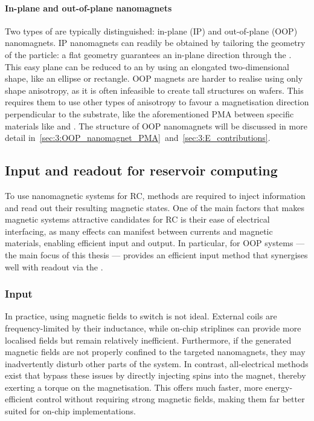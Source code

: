 \paragraph{In-plane and out-of-plane nanomagnets} %
Two types of  are typically distinguished: in-plane (IP) and out-of-plane (OOP) nanomagnets.
IP nanomagnets can readily be obtained by tailoring the geometry of the  particle: a flat geometry guarantees an in-plane  direction through the .
This easy plane can be reduced to an  by using an elongated two-dimensional shape, like an ellipse or rectangle.
OOP magnets are harder to realise using only shape anisotropy, as it is often infeasible to create tall structures on wafers.
This requires them to use other types of anisotropy to favour a magnetisation direction perpendicular to the substrate, like the aforementioned PMA between specific materials like  and .
The structure of OOP nanomagnets will be discussed in more detail in~\cref{sec:3:OOP_nanomagnet_PMA}~and~\ref{sec:3:E_contributions}.

\subsection{Input and readout for reservoir computing}\label{sec:1:ASI_IO}
To use nanomagnetic systems for RC, methods are required to inject information and read out their resulting magnetic states.
One of the main factors that makes magnetic systems attractive candidates for RC is their ease of electrical interfacing, as many effects can manifest between currents and magnetic materials, enabling efficient input and output.
In particular, for OOP systems --- the main focus of this thesis ---  provides an efficient input method that synergises well with readout via the .

\subsubsection{Input}
In practice, using magnetic fields to switch  is not ideal.
External coils are frequency-limited by their inductance, while on-chip striplines can provide more localised fields but remain relatively inefficient.
Furthermore, if the generated magnetic fields are not properly confined to the targeted nanomagnets, they may inadvertently disturb other parts of the system.
In contrast, all-electrical methods exist that bypass these issues by directly injecting spins into the magnet, thereby exerting a torque on the magnetisation.
This offers much faster, more energy-efficient control without requiring strong magnetic fields, making them far better suited for on-chip implementations.

